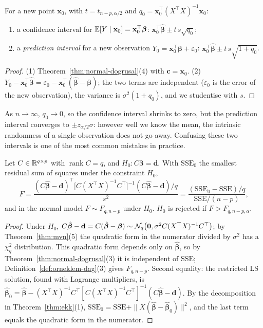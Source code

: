 \documentclass[main.tex]{subfiles}
\begin{document}
\begin{corollary}\label{cor:regresyon-aralik}
For a new point $\mathbf x_0$, with $t=t_{n-p,\alpha/2}$ and $q_0=\mathbf x_0^\top(X^\top X)^{-1}\mathbf x_0$:
\begin{enumerate}
  \item a confidence interval for $\mathbb{E}[Y\mid\mathbf x_0]=\mathbf x_0^\top\bm\beta$: $\mathbf x_0^\top\hat{\bm\beta}\pm t\,s\sqrt{q_0}$;
  \item a \emph{prediction interval} for a new observation $Y_0=\mathbf x_0^\top\bm\beta+\varepsilon_0$: $\mathbf x_0^\top\hat{\bm\beta}\pm t\,s\sqrt{1+q_0}$.
\end{enumerate}
\end{corollary}
\begin{proof}
(1) Theorem~\ref{thm:normal-dogrusal}(4) with $\mathbf c=\mathbf x_0$. (2) $Y_0-\mathbf x_0^\top\hat{\bm\beta}=\varepsilon_0-\mathbf x_0^\top(\hat{\bm\beta}-\bm\beta)$; the two terms are independent ($\varepsilon_0$ is the error of the new observation), the variance is $\sigma^2(1+q_0)$, and we studentise with $s$.
\end{proof}

\begin{remark}
As $n\to\infty$, $q_0\to0$, so the confidence interval shrinks to zero, but the prediction interval converges to $\pm z_{\alpha/2}\sigma$: however well we know the mean, the intrinsic randomness of a single observation does not go away. Confusing these two intervals is one of the most common mistakes in practice.
\end{remark}

\begin{theorem}\label{thm:f-testi}
Let $C\in\mathbb{R}^{q\times p}$ with $\operatorname{rank}C=q$, and $H_0:C\bm\beta=\mathbf d$. With $\mathrm{SSE}_0$ the smallest residual sum of squares under the constraint $H_0$,
\[
F=\frac{(C\hat{\bm\beta}-\mathbf d)^\top\big[C(X^\top X)^{-1}C^\top\big]^{-1}(C\hat{\bm\beta}-\mathbf d)/q}{s^2}=\frac{(\mathrm{SSE}_0-\mathrm{SSE})/q}{\mathrm{SSE}/(n-p)} ,
\]
and in the normal model $F\sim F_{q,n-p}$ under $H_0$. $H_0$ is rejected if $F>F_{q,n-p,\alpha}$.
\end{theorem}
\begin{proof}
Under $H_0$, $C\hat{\bm\beta}-\mathbf d=C(\hat{\bm\beta}-\bm\beta)\sim\mathcal{N}_q\big(\mathbf 0,\sigma^2C(X^\top X)^{-1}C^\top\big)$; by Theorem~\ref{thm:mvn}(5) the quadratic form in the numerator divided by $\sigma^2$ has a $\chi^2_q$ distribution. This quadratic form depends only on $\hat{\bm\beta}$, so by Theorem~\ref{thm:normal-dogrusal}(3) it is independent of $\mathrm{SSE}$; Definition~\ref{def:orneklem-dag}(3) gives $F_{q,n-p}$.
Second equality: the restricted LS solution, found with Lagrange multipliers, is $\hat{\bm\beta}_0=\hat{\bm\beta}-(X^\top X)^{-1}C^\top[C(X^\top X)^{-1}C^\top]^{-1}(C\hat{\bm\beta}-\mathbf d)$. By the decomposition in Theorem~\ref{thm:ekk}(1), $\mathrm{SSE}_0=\mathrm{SSE}+\|X(\hat{\bm\beta}-\hat{\bm\beta}_0)\|^2$, and the last term equals the quadratic form in the numerator.
\end{proof}
\end{document}
